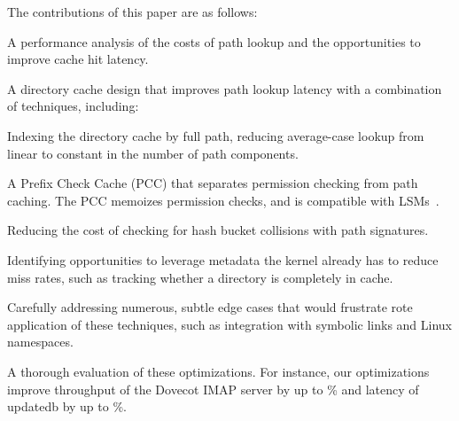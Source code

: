 The contributions of this paper are as follows:
\begin{compactitem}
\item A performance analysis of the costs of path lookup and the opportunities
to improve cache hit latency.
\item A directory cache design that improves path lookup latency with a combination of techniques, including:
  \begin{compactitem}
  \item Indexing the directory cache by full path, reducing average-case lookup from linear to constant in the number of path components.
  \item A Prefix Check Cache (PCC) that separates permission checking from path caching.  The PCC memoizes permission checks, and is compatible with LSMs~\citep{wright+lsm}.
  \item Reducing the cost of checking for hash bucket collisions with path signatures.
  \end{compactitem}
\item Identifying opportunities to leverage metadata the kernel already has to reduce miss rates, such as tracking whether a directory is completely in cache.
\item Carefully addressing numerous, subtle edge cases that would frustrate rote application of these techniques, such as integration with symbolic links and Linux namespaces.
\item A thorough evaluation of these optimizations.  For instance, our optimizations improve throughput
of the Dovecot IMAP server by up to \dovecotspeedup\% and latency of 
updatedb by up to \updatedbspeedup{}\%.

\end{compactitem}
